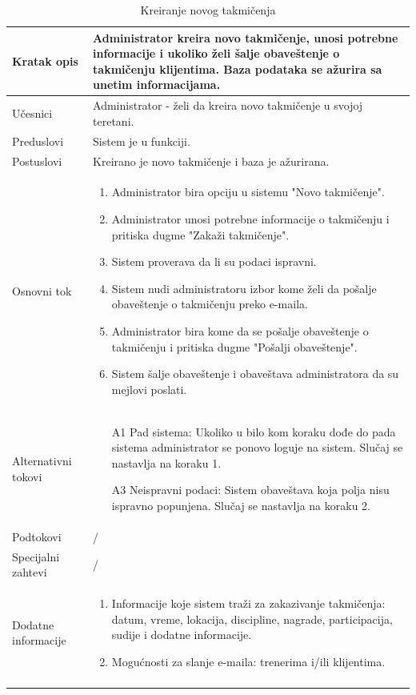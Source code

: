 \documentclass[../../main.tex]{subfiles}
\begin{document}
\begin{longtable}{| p{} | p{} |} 
\hline
    Kratak opis &  Administrator kreira novo takmičenje, unosi potrebne informacije i ukoliko želi šalje obaveštenje o takmičenju klijentima. Baza podataka se ažurira sa unetim informacijama.\\ 
\hline    
    Učesnici & Administrator - želi da kreira novo takmičenje u svojoj teretani.\\
\hline
   Preduslovi & Sistem je u funkciji. \\
\hline  
    Postuslovi & Kreirano je novo takmičenje i baza je ažurirana.\\
\hline
    Osnovni tok & \begin{enumerate}
        \item Administrator bira opciju u sistemu "Novo takmičenje".
        \item Administrator unosi potrebne informacije o takmičenju i pritiska dugme "Zakaži takmičenje".
        \item Sistem proverava da li su podaci ispravni.
        \item Sistem nudi administratoru izbor kome želi da pošalje obaveštenje o takmičenju preko e-maila.
        \item Administrator bira kome da se pošalje obaveštenje o takmičenju i pritiska dugme "Pošalji obaveštenje".
        \item Sistem šalje obaveštenje i obaveštava administratora da su mejlovi poslati.
    \end{enumerate}\\
\hline
    Alternativni tokovi &  \begin{itemize}
        \item[A1] Pad sistema: Ukoliko u bilo kom koraku dođe do pada sistema administrator se ponovo loguje na sistem. Slučaj se nastavlja na koraku 1.  
        \item[A3] Neispravni podaci: Sistem obaveštava koja polja nisu ispravno popunjena. Slučaj se nastavlja na koraku 2.
    \end{itemize}\\
\hline
    Podtokovi & /\\
\hline
    Specijalni zahtevi & /\\
\hline
    Dodatne informacije & \begin{enumerate}
        \item Informacije koje sistem traži za zakazivanje takmičenja: datum, vreme, lokacija, discipline, nagrade, participacija, sudije i dodatne informacije.
        \item Mogućnosti za slanje e-maila: trenerima i/ili klijentima.
    \end{enumerate}\\
\hline
\caption{Kreiranje novog takmičenja}
\end{longtable}
\end{document}
